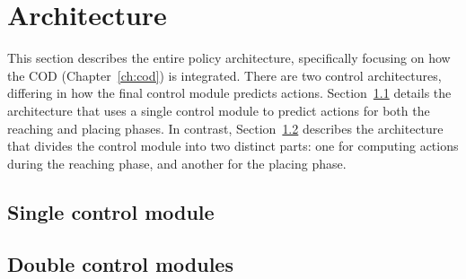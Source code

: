 \section{Architecture}
\label{sec:ocpl_architecture}
This section describes the entire policy architecture, specifically focusing on how the COD (Chapter~\ref{ch:cod}) is integrated. There are two control architectures, differing in how the final control module predicts actions. Section~\ref{sec:ocpl_architecture_scm} details the architecture that uses a single control module to predict actions for both the reaching and placing phases. In contrast, Section~\ref{sec:ocpl_architecture_dcm} describes the architecture that divides the control module into two distinct parts: one for computing actions during the reaching phase, and another for the placing phase.

\subsection{Single control module}
\label{sec:ocpl_architecture_scm}
\subsection{Double control modules}
\label{sec:ocpl_architecture_dcm}